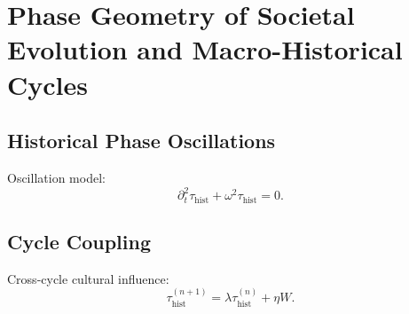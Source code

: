 \chapter{Phase Geometry of Societal Evolution and Macro-Historical Cycles}

\section{Historical Phase Oscillations}
Oscillation model:
\[
\partial_t^2\tau_{\mathrm{hist}} + \omega^2\tau_{\mathrm{hist}} = 0.
\]

\section{Cycle Coupling}
Cross-cycle cultural influence:
\[
\tau_{\mathrm{hist}}^{(n+1)} = \lambda\tau_{\mathrm{hist}}^{(n)} + \eta W.
\]
